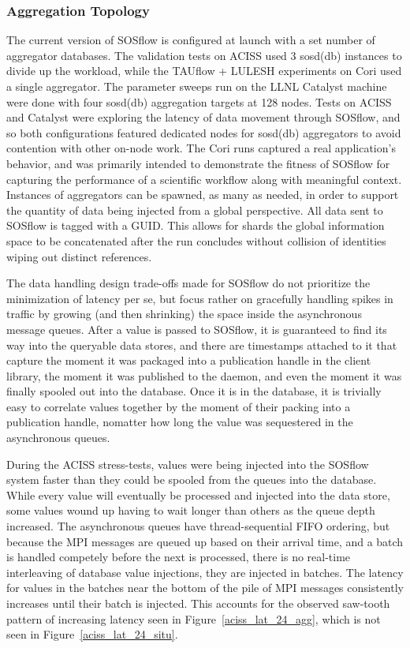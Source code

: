 \subsubsection{Aggregation Topology}
The current version of SOSflow is configured at launch with a set
number of aggregator databases.
%
The validation tests on ACISS used 3 sosd(db) instances to divide up
the workload, while the TAUflow + LULESH experiments on Cori used a
single aggregator.
%
The parameter sweeps run on the LLNL Catalyst machine were done with
four sosd(db) aggregation targets at 128 nodes.
%
Tests on ACISS and Catalyst were exploring the latency of data
movement through SOSflow, and so both configurations featured
dedicated nodes for sosd(db) aggregators to avoid contention
with other on-node work.
%
The Cori runs captured a real application's behavior, and was primarily
intended to demonstrate the fitness of SOSflow for capturing the
performance of a scientific workflow along with meaningful context.
%
Instances of aggregators can be spawned, as many as needed, in order
to support the quantity of data being injected from a global
perspective.
%
All data sent to SOSflow is tagged with a GUID.
%
This allows for shards the global information space to be concatenated
after the run concludes without collision of identities wiping out
distinct references.
%
\par
%
The data handling design trade-offs made for SOSflow do not prioritize
the minimization of latency per se, but focus rather on gracefully
handling spikes in traffic by growing (and then shrinking) the space
inside the asynchronous message queues.
%
After a value is passed to SOSflow, it is guaranteed to find its
way into the queryable data stores, and there are timestamps attached
to it that capture the moment it was packaged into a publication handle in
the client library, the moment it was published to the daemon, and
even the moment it was finally spooled out into the database.
%
Once it is in the database, it is trivially easy to correlate values
together by the moment of their packing into a publication handle, nomatter
how long the value was sequestered in the asynchronous queues.
%
\par
%
During the ACISS stress-tests, values were being injected into the
SOSflow system faster than they could be spooled from the queues into
the database.
%
While every value will eventually be processed and injected into the data
store, some values wound up having to wait longer than others as the queue
depth increased.
%
The asynchronous queues have thread-sequential FIFO ordering, but
because the MPI messages are queued up based on their arrival time,
and a batch is handled competely before the next is processed, there
is no real-time interleaving of database value injections, they are
injected in batches.
%
The latency for values in the batches near the bottom of the pile of
MPI messages consistently increases until their batch is injected.
%
This accounts for the observed saw-tooth pattern of increasing latency
seen in Figure~\ref{aciss_lat_24_agg}, which is not seen in
Figure~\ref{aciss_lat_24_situ}.
%
%


